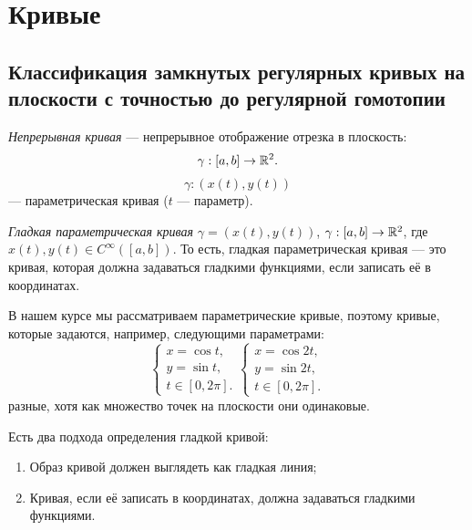 \section{Кривые}
\subsection{Классификация замкнутых регулярных кривых на плоскости с точностью до регулярной гомотопии}

\begin{definition}
    \textit{Непрерывная кривая} — непрерывное отображение отрезка в плоскость: $$\gamma: [a,b] \to \mathbb{R}^2.$$
    $$\gamma: (x(t), y(t))$$ — параметрическая кривая ($t$ — параметр).
\end{definition} 

\begin{definition}
    \textit{Гладкая параметрическая кривая} $\gamma = (x(t), y(t))$, $\gamma: [a,b] \to \mathbb{R}^2$, где $x(t), y(t) \in C^{\infty}([a,b])$. То есть, гладкая параметрическая кривая — это кривая, которая должна задаваться гладкими функциями, если записать её в координатах.
\end{definition}

В нашем курсе мы рассматриваем параметрические кривые, поэтому кривые, которые задаются, например, следующими параметрами:
$$\begin{cases}
    x = \cos{t}, \\
    y = \sin{t}, \\
    t \in [0, 2 \pi].
\end{cases}
\begin{cases}
    x = \cos{2t}, \\
    y = \sin{2t}, \\
    t \in [0, 2 \pi].
\end{cases}$$
разные, хотя как множество точек на плоскости они одинаковые.

Есть два подхода определения гладкой кривой:
\begin{enumerate}
    \item Образ кривой должен выглядеть как гладкая линия;
    \item Кривая, если её записать в координатах, должна задаваться гладкими функциями.
\end{enumerate}

